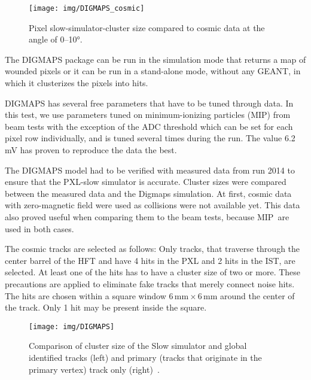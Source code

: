 \begin{figure}[!htb]
\begin{center}
 \texttt{[image: img/DIGMAPS\_cosmic]}\\
\end{center}
\caption{\label{cosmicDigmaps}Pixel slow-simulator-cluster size compared to cosmic data at the angle of 0--10°.}
\end{figure}

The DIGMAPS package can be run in the simulation mode that returns a map of wounded pixels or it can be run in a stand-alone mode, without any GEANT, in which it clusterizes the pixels into hits.


DIGMAPS has several free parameters that have to be tuned through data. In this test, we use parameters tuned on minimum-ionizing particles (MIP) from beam tests with the exception of the ADC threshold which can be set for each pixel row individually, and is tuned several times during the run. The value 6.2$\,$mV has proven to reproduce the data the best.
 
The DIGMAPS model had to be verified with measured data from run 2014 to ensure that the PXL-slow simulator is accurate. Cluster sizes were compared between the measured data and the Digmaps simulation. At first, cosmic data with zero-magnetic field were used as collisions were not available yet. This data also proved useful when comparing them to the beam tests, because MIP\ are used in both cases.


The cosmic tracks are selected as follows: Only tracks, that traverse through the center barrel of the HFT and have 4 hits in the PXL and 2 hits in the IST, are selected. At least one of the hits has to have a cluster size of two or more. These precautions are applied to eliminate fake tracks that merely connect noise hits. The hits are chosen within a square window $6\,\mathrm{mm}\times6\,\mathrm{mm}$ around the center of the track. Only 1 hit may be present inside the square.

\begin{figure}[!tb]
\begin{center}
 \texttt{[image: img/DIGMAPS]}\\
\end{center}
\caption{\label{AuAuDigmaps}Comparison of cluster size of the Slow simulator and global identified tracks (left) and primary (tracks that originate in the primary vertex) track only
(right)~\cite{KubaVyzkumak}.}
\end{figure}


